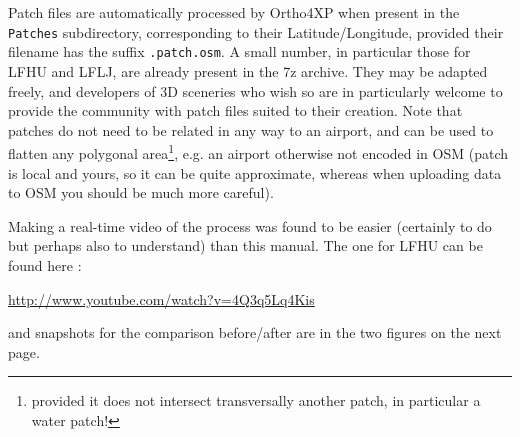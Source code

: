 \documentclass[12pt]{article}
\begin{document}
Patch files are automatically processed by Ortho4XP when present in the {\tt Patches} subdirectory, corresponding to their Latitude/Longitude, provided their filename has the suffix {\tt .patch.osm}.
A small number, in particular those for LFHU and LFLJ, are already present in the 7z archive. They may be adapted freely, and developers of 3D sceneries who wish so are in particularly welcome to provide the community with patch files suited to their creation. Note that patches do not need to be related in any way to an airport, and can be used to flatten any polygonal area\footnote{provided it does not intersect transversally another patch, in particular a water patch!}, e.g. an airport otherwise not encoded in OSM (patch is local and yours, so it can be quite approximate, whereas when uploading data to OSM you should be much more careful).

Making a real-time video of the process was found to be easier (certainly to do but perhaps also to understand) than this manual. The one for LFHU can be found here :
\begin{center}
\href{http://www.youtube.com/watch?v=4Q3q5Lq4Kis}{http://www.youtube.com/watch?v=4Q3q5Lq4Kis}
\end{center}
and snapshots for the comparison before/after are in the two figures on the next page.\pagebreak
\end{document}
